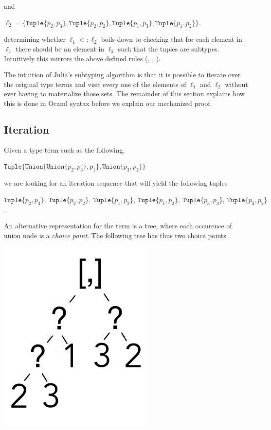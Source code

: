 \documentclass[a4paper,english]{lipics-v2019}
\newcommand{\xt}[1]{\texttt{#1}}
\newcommand{\union}[2]{\xt{Union\{}#1,#2\xt{\}}}
\newcommand{\tuple}[1]{\xt{Tuple\{}#1\xt{\}}}
\begin{document}
\noindent and

\medskip
$\ell_2 = \{  \tuple{p_2,p_3}, \tuple{p_2,p_2}, \tuple{p_1,p_3}, 
          \tuple{p_1,p_2} \}$.
\medskip

\noindent determining whether $\ell_1 <: \ell_2$ boils down to checking that
for each element in $\ell_1$ there should be an element in $\ell_2$ such
that the tuples are subtypes. Intuitively this mirrors the above defined
rules ({\sc [allexist]}, {\sc [existL/R]}, {\sc [tuple]}).

The intuition of Julia's subtyping algorithm is that it is possible to
iterate over the original type terms and visit every one of the elements of
$\ell_1$ and $\ell_2$ without ever having to materialize those sets. The
remainder of this section explains how this is done in Ocaml syntax before
we explain our mechanized proof.

\subsection{Iteration}

Given a type term such as the following,

\medskip
$\tuple{ \union{ \union{p_2}{p_3} }{p_1}, \union{p_3}{p_2}}$
\medskip

\noindent
we are looking for an iteration sequence that will yield the following tuples

\medskip
\noindent $\tuple{p_2,p_3}, ~ \tuple{p_2,p_2}, ~ \tuple{p_1,p_3}, ~ \tuple{p_1,p_2}, ~
  \tuple{p_3,p_3}, ~ \tuple{p_3,p_2}$.

\noindent
An alternative representation for the term is a tree, where each occurence
of union node is a \emph{choice point}. The following tree has thus two
choice points.

\includegraphics[scale=.25]{figures/tree1.pdf}
\end{document}
